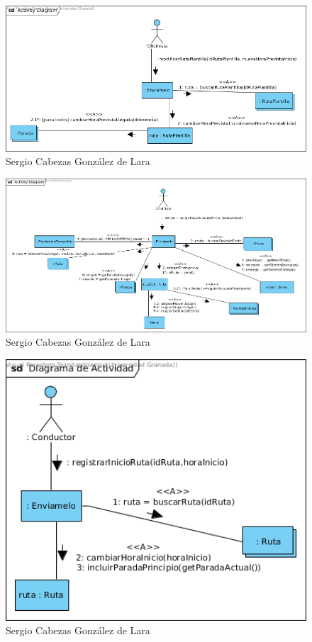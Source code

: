\begin{figure}[H]
	\centering
	\includegraphics[width=16cm]{5}
	\caption{Sergio Cabezas González de Lara}
\end{figure}
\begin{figure}[H]
	\centering
	\includegraphics[width=16cm]{6}
	\caption{Sergio Cabezas González de Lara}
\end{figure}
\begin{figure}[H]
	\centering
	\includegraphics[width=16cm]{7}
	\caption{Sergio Cabezas González de Lara}
\end{figure}
